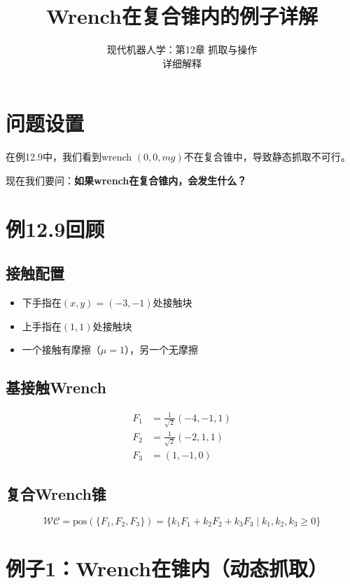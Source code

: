 \documentclass[12pt,a4paper]{article}
\title{Wrench在复合锥内的例子详解}
\author{现代机器人学：第12章 抓取与操作\\
详细解释}
\date{}
\begin{document}
\maketitle

\section{问题设置}

在例12.9中，我们看到wrench $(0, 0, mg)$不在复合锥中，导致静态抓取不可行。

现在我们要问：\textbf{如果wrench在复合锥内，会发生什么？}

\section{例12.9回顾}

\subsection{接触配置}

\begin{itemize}
    \item 下手指在$(x, y) = (-3, -1)$处接触块
    \item 上手指在$(1, 1)$处接触块
    \item 一个接触有摩擦（$\mu = 1$），另一个无摩擦
\end{itemize}

\subsection{基接触Wrench}

\begin{align}
F_1 &= \frac{1}{\sqrt{2}}(-4, -1, 1) \\
F_2 &= \frac{1}{\sqrt{2}}(-2, 1, 1) \\
F_3 &= (1, -1, 0)
\end{align}

\subsection{复合Wrench锥}

\begin{equation}
\mathcal{WC} = \text{pos}(\{F_1, F_2, F_3\}) = \{k_1 F_1 + k_2 F_2 + k_3 F_3 \mid k_1, k_2, k_3 \geq 0\}
\end{equation}

\section{例子1：Wrench在锥内（动态抓取）}
\end{document}
